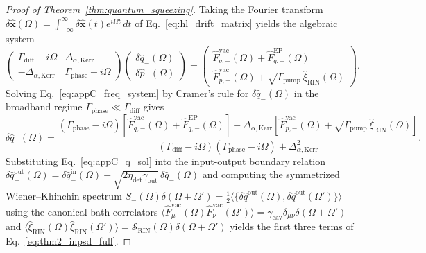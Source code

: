 \documentclass[11pt,letterpaper]{article}
\theoremstyle{definition}
\theoremstyle{remark}
\begin{document}
\begin{proof}[Proof of Theorem~\ref{thm:quantum_squeezing}]
Taking the Fourier transform $\delta\hat{\mathbf{x}}(\Omega) = \int_{-\infty}^\infty \delta\hat{\mathbf{x}}(t)e^{i\Omega t}\,dt$ of Eq.~\eqref{eq:hl_drift_matrix} yields the algebraic system
\begin{equation}
\begin{pmatrix} \Gamma_{\mathrm{diff}} - i\Omega & \Delta_{\alpha,\mathrm{Kerr}} \\ -\Delta_{\alpha,\mathrm{Kerr}} & \Gamma_{\mathrm{phase}} - i\Omega \end{pmatrix}\begin{pmatrix} \delta\hat{q}_-(\Omega) \\ \delta\hat{p}_-(\Omega) \end{pmatrix} = \begin{pmatrix} \hat{F}_{q,-}^{\mathrm{vac}}(\Omega) + \hat{F}_{q,-}^{\mathrm{EP}}(\Omega) \\ \hat{F}_{p,-}^{\mathrm{vac}}(\Omega) + \sqrt{\Gamma_{\mathrm{pump}}}\,\hat{\xi}_{\mathrm{RIN}}(\Omega) \end{pmatrix}.
\label{eq:appC_freq_system}
\end{equation}
Solving Eq.~\eqref{eq:appC_freq_system} by Cramer's rule for $\delta\hat{q}_-(\Omega)$ in the broadband regime $\Gamma_{\mathrm{phase}} \ll \Gamma_{\mathrm{diff}}$ gives
\begin{equation}
\delta\hat{q}_-(\Omega) = \frac{(\Gamma_{\mathrm{phase}} - i\Omega)\left[\hat{F}_{q,-}^{\mathrm{vac}}(\Omega) + \hat{F}_{q,-}^{\mathrm{EP}}(\Omega)\right] - \Delta_{\alpha,\mathrm{Kerr}}\left[\hat{F}_{p,-}^{\mathrm{vac}}(\Omega) + \sqrt{\Gamma_{\mathrm{pump}}}\,\hat{\xi}_{\mathrm{RIN}}(\Omega)\right]}{(\Gamma_{\mathrm{diff}} - i\Omega)(\Gamma_{\mathrm{phase}} - i\Omega) + \Delta_{\alpha,\mathrm{Kerr}}^2}.
\label{eq:appC_q_sol}
\end{equation}
Substituting Eq.~\eqref{eq:appC_q_sol} into the input-output boundary relation $\delta\hat{q}_-^{\mathrm{out}}(\Omega) = \delta\hat{q}_-^{\mathrm{in}}(\Omega) - \sqrt{2\eta_{\mathrm{det}}\gamma_{\mathrm{out}}}\,\delta\hat{q}_-(\Omega)$ and computing the symmetrized Wiener--Khinchin spectrum $S_-(\Omega)\delta(\Omega + \Omega') = \frac{1}{2}\langle\{\delta\hat{q}_-^{\mathrm{out}}(\Omega), \delta\hat{q}_-^{\mathrm{out}}(\Omega')\}\rangle$ using the canonical bath correlators $\langle\hat{F}_{\mu}^{\mathrm{vac}}(\Omega)\hat{F}_{\nu}^{\mathrm{vac}}(\Omega')\rangle = \gamma_{\mathrm{cav}}\delta_{\mu\nu}\delta(\Omega + \Omega')$ and $\langle\hat{\xi}_{\mathrm{RIN}}(\Omega)\hat{\xi}_{\mathrm{RIN}}(\Omega')\rangle = \mathcal{S}_{\mathrm{RIN}}(\Omega)\delta(\Omega + \Omega')$ yields the first three terms of Eq.~\eqref{eq:thm2_inpsd_full}.


\end{proof}
\end{document}
